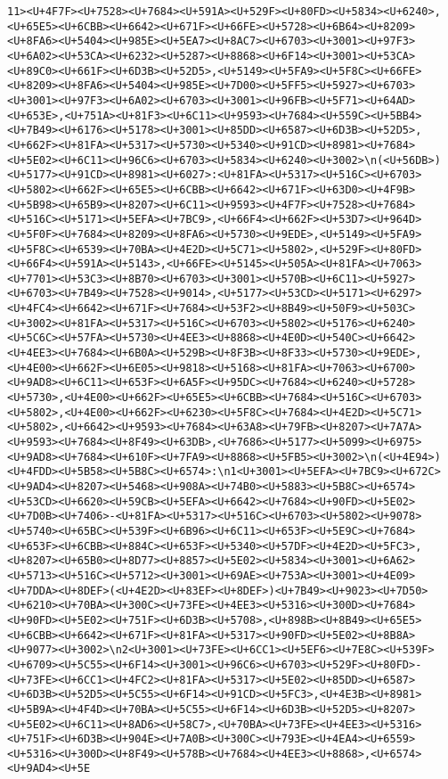 \documentclass[
]{article}
\begin{document}
\begin{verbatim}
11><U+4F7F><U+7528><U+7684><U+591A><U+529F><U+80FD><U+5834><U+6240>,<U+65E5><U+6CBB><U+6642><U+671F><U+66FE><U+5728><U+6B64><U+8209><U+8FA6><U+5404><U+985E><U+5EA7><U+8AC7><U+6703><U+3001><U+97F3><U+6A02><U+53CA><U+6232><U+5287><U+8868><U+6F14><U+3001><U+53CA><U+89C0><U+661F><U+6D3B><U+52D5>,<U+5149><U+5FA9><U+5F8C><U+66FE><U+8209><U+8FA6><U+5404><U+985E><U+7D00><U+5FF5><U+5927><U+6703><U+3001><U+97F3><U+6A02><U+6703><U+3001><U+96FB><U+5F71><U+64AD><U+653E>,<U+751A><U+81F3><U+6C11><U+9593><U+7684><U+559C><U+5BB4><U+7B49><U+6176><U+5178><U+3001><U+85DD><U+6587><U+6D3B><U+52D5>,<U+662F><U+81FA><U+5317><U+5730><U+5340><U+91CD><U+8981><U+7684><U+5E02><U+6C11><U+96C6><U+6703><U+5834><U+6240><U+3002>\n(<U+56DB>)<U+5177><U+91CD><U+8981><U+6027>:<U+81FA><U+5317><U+516C><U+6703><U+5802><U+662F><U+65E5><U+6CBB><U+6642><U+671F><U+63D0><U+4F9B><U+5B98><U+65B9><U+8207><U+6C11><U+9593><U+4F7F><U+7528><U+7684><U+516C><U+5171><U+5EFA><U+7BC9>,<U+66F4><U+662F><U+53D7><U+964D><U+5F0F><U+7684><U+8209><U+8FA6><U+5730><U+9EDE>,<U+5149><U+5FA9><U+5F8C><U+6539><U+70BA><U+4E2D><U+5C71><U+5802>,<U+529F><U+80FD><U+66F4><U+591A><U+5143>,<U+66FE><U+5145><U+505A><U+81FA><U+7063><U+7701><U+53C3><U+8B70><U+6703><U+3001><U+570B><U+6C11><U+5927><U+6703><U+7B49><U+7528><U+9014>,<U+5177><U+53CD><U+5171><U+6297><U+4FC4><U+6642><U+671F><U+7684><U+53F2><U+8B49><U+50F9><U+503C><U+3002><U+81FA><U+5317><U+516C><U+6703><U+5802><U+5176><U+6240><U+5C6C><U+57FA><U+5730><U+4EE3><U+8868><U+4E0D><U+540C><U+6642><U+4EE3><U+7684><U+6B0A><U+529B><U+8F3B><U+8F33><U+5730><U+9EDE>,<U+4E00><U+662F><U+6E05><U+9818><U+5168><U+81FA><U+7063><U+6700><U+9AD8><U+6C11><U+653F><U+6A5F><U+95DC><U+7684><U+6240><U+5728><U+5730>,<U+4E00><U+662F><U+65E5><U+6CBB><U+7684><U+516C><U+6703><U+5802>,<U+4E00><U+662F><U+6230><U+5F8C><U+7684><U+4E2D><U+5C71><U+5802>,<U+6642><U+9593><U+7684><U+63A8><U+79FB><U+8207><U+7A7A><U+9593><U+7684><U+8F49><U+63DB>,<U+7686><U+5177><U+5099><U+6975><U+9AD8><U+7684><U+610F><U+7FA9><U+8868><U+5FB5><U+3002>\n(<U+4E94>)<U+4FDD><U+5B58><U+5B8C><U+6574>:\n1<U+3001><U+5EFA><U+7BC9><U+672C><U+9AD4><U+8207><U+5468><U+908A><U+74B0><U+5883><U+5B8C><U+6574><U+53CD><U+6620><U+59CB><U+5EFA><U+6642><U+7684><U+90FD><U+5E02><U+7D0B><U+7406>-<U+81FA><U+5317><U+516C><U+6703><U+5802><U+9078><U+5740><U+65BC><U+539F><U+6B96><U+6C11><U+653F><U+5E9C><U+7684><U+653F><U+6CBB><U+884C><U+653F><U+5340><U+57DF><U+4E2D><U+5FC3>,<U+8207><U+65B0><U+8D77><U+8857><U+5E02><U+5834><U+3001><U+6A62><U+5713><U+516C><U+5712><U+3001><U+69AE><U+753A><U+3001><U+4E09><U+7DDA><U+8DEF>(<U+4E2D><U+83EF><U+8DEF>)<U+7B49><U+9023><U+7D50><U+6210><U+70BA><U+300C><U+73FE><U+4EE3><U+5316><U+300D><U+7684><U+90FD><U+5E02><U+751F><U+6D3B><U+5708>,<U+898B><U+8B49><U+65E5><U+6CBB><U+6642><U+671F><U+81FA><U+5317><U+90FD><U+5E02><U+8B8A><U+9077><U+3002>\n2<U+3001><U+73FE><U+6CC1><U+5EF6><U+7E8C><U+539F><U+6709><U+5C55><U+6F14><U+3001><U+96C6><U+6703><U+529F><U+80FD>-<U+73FE><U+6CC1><U+4FC2><U+81FA><U+5317><U+5E02><U+85DD><U+6587><U+6D3B><U+52D5><U+5C55><U+6F14><U+91CD><U+5FC3>,<U+4E3B><U+8981><U+5B9A><U+4F4D><U+70BA><U+5C55><U+6F14><U+6D3B><U+52D5><U+8207><U+5E02><U+6C11><U+8AD6><U+58C7>,<U+70BA><U+73FE><U+4EE3><U+5316><U+751F><U+6D3B><U+904E><U+7A0B><U+300C><U+793E><U+4EA4><U+6559><U+5316><U+300D><U+8F49><U+578B><U+7684><U+4EE3><U+8868>,<U+6574><U+9AD4><U+5E
\end{verbatim}
\end{document}
